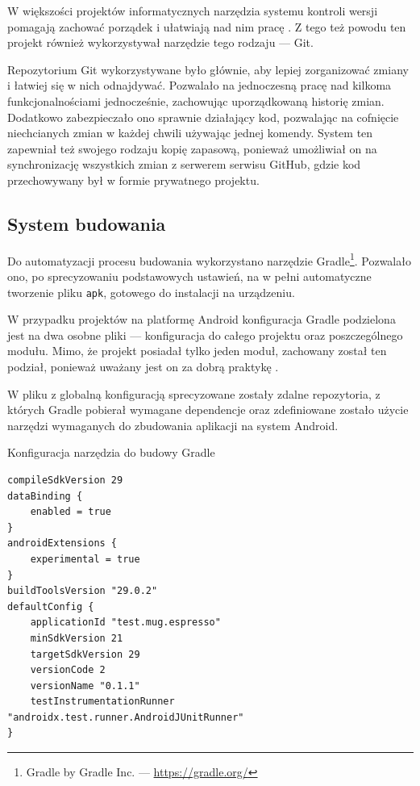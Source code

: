 \documentclass[polish,polish,a4paper,12pt]{article}
\begin{document}
	W większości projektów informatycznych narzędzia systemu kontroli wersji pomagają zachować porządek i ułatwiają nad nim pracę \cite{git}. Z tego też powodu ten projekt również wykorzystywał narzędzie tego rodzaju — Git.

	Repozytorium Git wykorzystywane było głównie, aby lepiej zorganizować zmiany i łatwiej się w nich odnajdywać. Pozwalało na jednoczesną pracę nad kilkoma funkcjonalnościami jednocześnie, zachowując uporządkowaną historię zmian. Dodatkowo zabezpieczało ono sprawnie działający kod, pozwalając na cofnięcie niechcianych zmian w każdej chwili używając jednej komendy. System ten zapewniał też swojego rodzaju kopię zapasową, ponieważ umożliwiał on na synchronizację wszystkich zmian z serwerem serwisu GitHub, gdzie kod przechowywany był w formie prywatnego projektu.

	\subsection{System budowania}

	Do automatyzacji procesu budowania wykorzystano narzędzie Gradle\footnote{Gradle by Gradle Inc. — \url{https://gradle.org/}}. Pozwalało ono, po sprecyzowaniu podstawowych ustawień, na w pełni automatyczne tworzenie pliku \texttt{apk}, gotowego do instalacji na urządzeniu.

	W przypadku projektów na platformę Android konfiguracja Gradle podzielona jest na dwa osobne pliki — konfiguracja do całego projektu oraz poszczególnego modułu. Mimo, że projekt posiadał tylko jeden moduł, zachowany został ten podział, ponieważ uważany jest on za dobrą praktykę \cite{kotlin}.

	W pliku z globalną konfiguracją sprecyzowane zostały zdalne repozytoria, z których Gradle pobierał wymagane dependencje oraz zdefiniowane zostało użycie narzędzi wymaganych do zbudowania aplikacji na system Android.

	\begin{listing}[H]
		\caption{Konfiguracja narzędzia do budowy Gradle}
		\begin{verbatim}
compileSdkVersion 29
dataBinding {
	enabled = true
}
androidExtensions {
	experimental = true
}
buildToolsVersion "29.0.2"
defaultConfig {
	applicationId "test.mug.espresso"
	minSdkVersion 21
	targetSdkVersion 29
	versionCode 2
	versionName "0.1.1"
	testInstrumentationRunner "androidx.test.runner.AndroidJUnitRunner"
}
		\end{verbatim}
		\label{listing:gradle}
	\end{listing}
\end{document}
